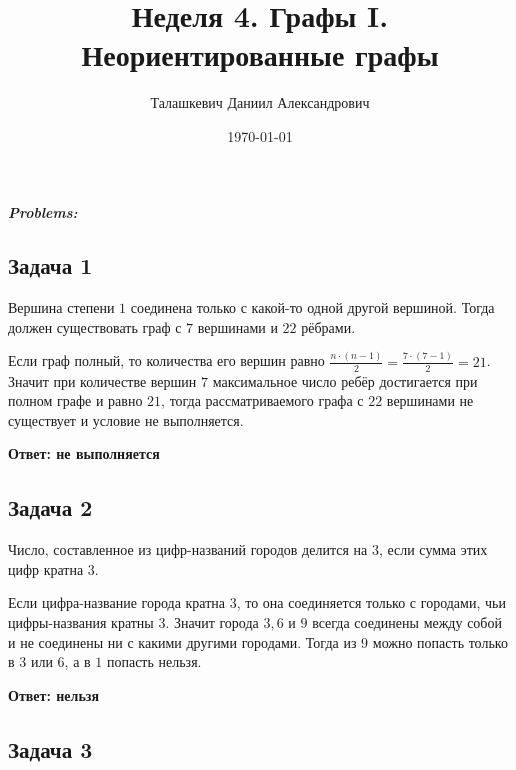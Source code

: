 \documentclass[a4paper,12pt]{article} %
\author{Талашкевич Даниил Александрович}
\title{Неделя 4. Графы I. Неориентированные графы}
\date{\today}
\begin{document}
\maketitle
\thispagestyle{empty}

\newpage
\setcounter{page}{1}
\begin{center}
\itshape
\bfseries
{ \Large Problems:}
\end{center}

\begin{center}
\section*{Задача 1}
\end{center}

Вершина степени $1$ соединена только с какой-то одной другой вершиной. Тогда должен существовать граф с $7$ вершинами и $22$ рёбрами.

Если граф полный, то количества его вершин равно $\frac{n\cdot (n-1)}{2} = \frac{7\cdot (7-1)}{2} = 21$. Значит при количестве вершин $7$ максимальное число ребёр достигается при полном графе и равно $21$, тогда рассматриваемого графа с $22$ вершинами не существует и условие не выполняется.

\begin{flushright}
\begin{large}
\textbf {Ответ: не выполняется}
\end{large}
\end{flushright}

\begin{center}
\section*{Задача 2}
\end{center}

Число, составленное из цифр-названий городов делится на $3$, если сумма этих цифр кратна 3.

Если цифра-название города кратна $3$, то она соединяется только с городами, чьи цифры-названия кратны 3. Значит города $3, 6$ и $9$ всегда соединены между собой и не соединены ни с какими другими городами. Тогда из $9$ можно попасть только в $3$ или $6$, а в $1$ попасть нельзя.

\begin{flushright}
\begin{large}
\textbf {Ответ: нельзя}
\end{large}
\end{flushright}
\newpage
\begin{center}
\section*{Задача 3}
\end{center}
\end{document}
